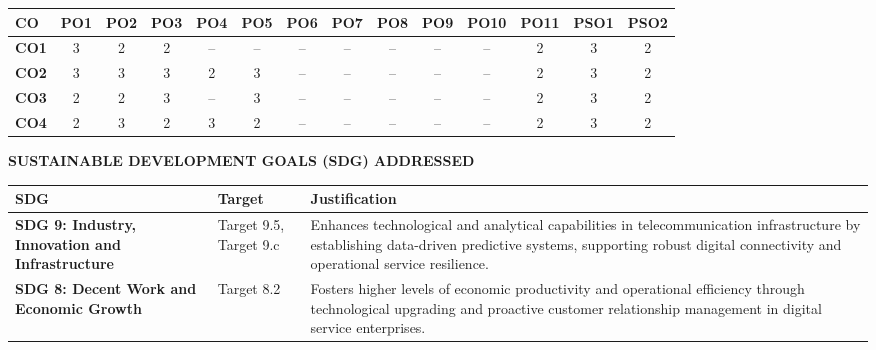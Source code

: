 \vspace{0.3cm}
\begin{table}[H]
\centering
\small
\begin{tabular}{|l|c|c|c|c|c|c|c|c|c|c|c|c|c|}
\hline
\textbf{CO} & \textbf{PO1} & \textbf{PO2} & \textbf{PO3} & \textbf{PO4} & \textbf{PO5} & \textbf{PO6} & \textbf{PO7} & \textbf{PO8} & \textbf{PO9} & \textbf{PO10} & \textbf{PO11} & \textbf{PSO1} & \textbf{PSO2} \\
\hline
\textbf{CO1} & 3 & 2 & 2 & -- & -- & -- & -- & -- & -- & -- & 2 & 3 & 2 \\
\hline
\textbf{CO2} & 3 & 3 & 3 & 2 & 3 & -- & -- & -- & -- & -- & 2 & 3 & 2 \\
\hline
\textbf{CO3} & 2 & 2 & 3 & -- & 3 & -- & -- & -- & -- & -- & 2 & 3 & 2 \\
\hline
\textbf{CO4} & 2 & 3 & 2 & 3 & 2 & -- & -- & -- & -- & -- & 2 & 3 & 2 \\
\hline
\end{tabular}
\end{table}

\vspace{0.4cm}
\begin{center}
    {\bfseries\large SUSTAINABLE DEVELOPMENT GOALS (SDG) ADDRESSED\par}
\end{center}
\vspace{0.1cm}

\begin{table}[H]
\centering
\small
\begin{tabular}{|p{2.8cm}|p{2.2cm}|p{8.8cm}|}
\hline
\textbf{SDG} & \textbf{Target} & \textbf{Justification} \\
\hline
\textbf{SDG 9: Industry, Innovation and Infrastructure} & Target 9.5, Target 9.c & Enhances technological and analytical capabilities in telecommunication infrastructure by establishing data-driven predictive systems, supporting robust digital connectivity and operational service resilience. \\
\hline
\textbf{SDG 8: Decent Work and Economic Growth} & Target 8.2 & Fosters higher levels of economic productivity and operational efficiency through technological upgrading and proactive customer relationship management in digital service enterprises. \\
\hline
\end{tabular}
\end{table}
